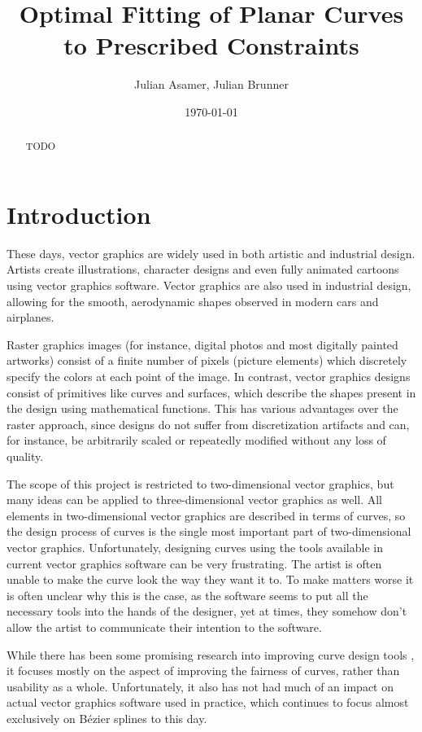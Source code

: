 \documentclass[a4paper]{article}
\title{Optimal Fitting of Planar Curves to Prescribed Constraints}
\author{Julian Asamer, Julian Brunner}
\date{\today}
\begin{document}
	\maketitle

	\begin{abstract}

		\noindent TODO

	\end{abstract}

	\section{Introduction}
	\label{section:introduction}

		These days, vector graphics are widely used in both artistic and industrial design. Artists create illustrations, character designs and even fully animated cartoons using vector graphics software. Vector graphics are also used in industrial design, allowing for the smooth, aerodynamic shapes observed in modern cars and airplanes.

		Raster graphics images (for instance, digital photos and most digitally painted artworks) consist of a finite number of pixels (picture elements) which discretely specify the colors at each point of the image. In contrast, vector graphics designs consist of primitives like curves and surfaces, which describe the shapes present in the design using mathematical functions. This has various advantages over the raster approach, since designs do not suffer from discretization artifacts and can, for instance, be arbitrarily scaled or repeatedly modified without any loss of quality.

		The scope of this project is restricted to two-dimensional vector graphics, but many ideas can be applied to three-dimensional vector graphics as well. All elements in two-dimensional vector graphics are described in terms of curves, so the design process of curves is the single most important part of two-dimensional vector graphics. Unfortunately, designing curves using the tools available in current vector graphics software can be very frustrating. The artist is often unable to make the curve look the way they want it to. To make matters worse it is often unclear why this is the case, as the software seems to put all the necessary tools into the hands of the designer, yet at times, they somehow don't allow the artist to communicate their intention to the software.

		While there has been some promising research into improving curve design tools \cite{thesis-mvc} \cite{thesis-spiro}, it focuses mostly on the aspect of improving the fairness of curves, rather than usability as a whole. Unfortunately, it also has not had much of an impact on actual vector graphics software used in practice, which continues to focus almost exclusively on Bézier splines to this day.
\end{document}
